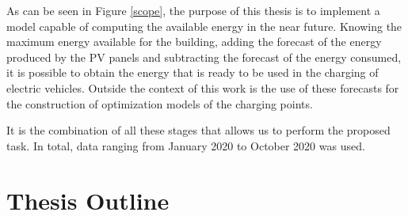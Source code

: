 As can be seen in Figure \ref{scope}, the purpose of this thesis is to implement a model capable of computing the available energy in the near future. Knowing the maximum energy available for the building, adding the forecast of the energy produced by the \ac{PV} panels and subtracting the forecast of the energy consumed, it is possible to obtain the energy that is ready to be used in the charging of electric vehicles. Outside the context of this work is the use of these forecasts for the construction of optimization models of the charging points. 

It is the combination of all these stages that allows us to perform the proposed task. In total, data ranging from January 2020 to October 2020 was used.





\section{Thesis Outline}